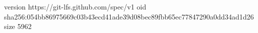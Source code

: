 version https://git-lfs.github.com/spec/v1
oid sha256:054bb86975669c03b43ecd41ade39d08bec89fbb65ec77847290a0dd34ad1d26
size 5962
